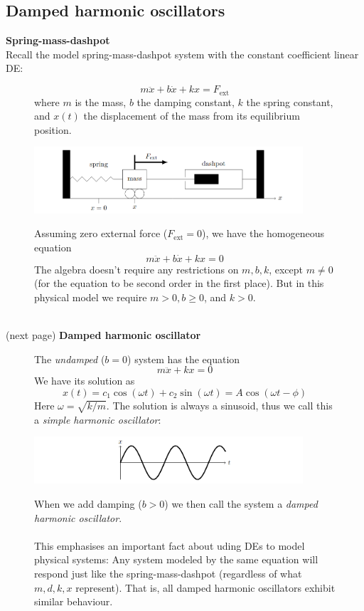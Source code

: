 \documentclass{report}
\begin{document}
\subsection{Damped harmonic oscillators}
\textbf{Spring-mass-dashpot}\\
Recall the model spring-mass-dashpot system with the constant coefficient linear DE:
\begin{figure}[h]
\begin{equation*}
m\ddot{x}+b\dot{x}+kx=F_\text{ext}
\end{equation*}
where $m$ is the mass, $b$ the damping constant, $k$ the spring constant, and $x(t)$ the displacement
of the mass from its equilibrium position.
\begin{center}
\includegraphics[width=10cm]{23}\\
\end{center}
Assuming zero external force ($F_\text{ext}=0$), we have
the homogeneous equation
\begin{equation*}
m\ddot{x}+b\dot{x}+kx=0
\end{equation*}
The algebra doesn't require any restrictions on $m,b,k$, except $m\neq0$ (for the equation to be second order
in the first place). But in this physical model we require $m>0,b\geq0$, and $k>0$.
\end{figure}\\
(next page)
\newpage
\noindent\textbf{Damped harmonic oscillator}
\begin{figure}[h]
The \textit{undamped} ($b=0$) system has the equation
\begin{equation*}
m\ddot{x}+kx=0
\end{equation*}
We have its solution as
\begin{equation*}
x(t)=c_1\cos(\omega t)+c_2\sin(\omega t)=A\cos(\omega t-\phi)
\end{equation*}
Here $\omega=\sqrt{k/m}$. The solution is always a sinusoid, thus we call this a 
\textit{simple harmonic oscillator}:
\begin{center}
\includegraphics[width=10cm]{24}\\
\end{center}
When we add damping ($b>0$) we then call the system a \textit{damped harmonic oscillator}.\\
\vspace{1mm}\\
This emphasises an important fact about uding DEs to model physical systems:
Any system modeled by the same equation will respond just like the spring-mass-dashpot (regardless of what $m,d,k,x$
represent). That is, all damped harmonic oscillators exhibit similar behaviour.
\end{figure}
\newpage
\end{document}
